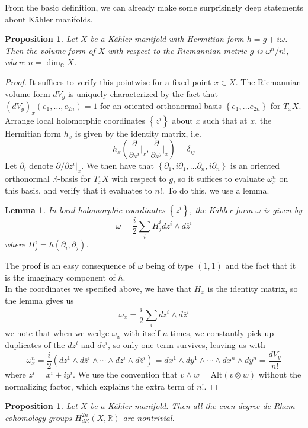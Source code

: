 \documentclass[psamsfonts, 12pt]{amsart}
\newtheorem{prop}[thm]{Proposition}
\newtheorem{lem}[thm]{Lemma}
\theoremstyle{definition}
\theoremstyle{remark}
\newcommand{\R}{\mathbb{R}}
\newcommand{\C}{\mathbb{C}}
\newcommand{\zbar}{\overline{z}}
\newcommand{\set}[1]{\left\lbrace #1 \right\rbrace}
\begin{document}
From the basic definition, we can already make some surprisingly deep statements about
K\"ahler manifolds.
%
\begin{prop}
Let $X$ be a K\"ahler manifold with Hermitian form $h = g + i\omega$. Then the volume
form of $X$ with respect to the Riemannian metric $g$ is $\omega^n/n!$, where
$n = \dim_\C X$.
\end{prop}
%
\begin{proof}
It suffices to verify this pointwise for a fixed point $x \in X$.
The Riemannian volume form $dV_g$ is uniquely characterized by the fact that
$(dV_g)_x(e_1, \ldots, e_{2n}) = 1$ for an oriented orthonormal basis
$\set{e_1, \ldots e_{2n}}$ for $T_xX$. Arrange local holomorphic coordinates
$\set{z^i}$ about $x$ such that at $x$, the Hermitian form $h_x$ is given by the
identity matrix, i.e.
\[
h_x\left(\frac{\partial}{\partial z^i}\bigg\vert_x,
\frac{\partial}{\partial z^j}\bigg\vert_x\right) = \delta_{ij}
\]
Let $\partial_i$ denote $\partial/\partial z^i\vert_x$. We then have that
$\set{\partial_1, i\partial_1, \ldots \partial_n, i\partial_n}$ is an oriented
orthonormal $\R$-basis for $T_xX$ with respect to $g$, so it suffices to evaluate
$\omega^n_x$ on this basis, and verify that it evaluates to $n!$. To do this, we
use a lemma.
%
\begin{lem}
In local holomorphic coordinates $\set{z^i}$, the K\"ahler form $\omega$ is given by
\[
\omega = \frac{i}{2}\sum_i H^i_j dz^i \wedge d\zbar^i
\]
where $H^i_j = h(\partial_i, \partial_j)$.
\end{lem}
%
The proof is an easy consequence of $\omega$ being of type $(1,1)$ and the
fact that it is the imaginary component of $h$. \\

In the coordinates we specified above, we have that $H_x$ is the identity matrix,
so the lemma gives us
\[
\omega_x = \frac{i}{2}\sum_i dz^i \wedge d\zbar^i
\]
we note that when we wedge $\omega_x$ with itself $n$ times, we constantly pick
up duplicates of the $dz^i$ and $d\zbar^i$, so only one term survives, leaving us
with
\[
\omega_x^n = \frac{i}{2}\left(dz^1 \wedge d\zbar^i \wedge \cdots \wedge
dz^i \wedge d\zbar^i\right) = dx^1 \wedge dy^1 \wedge \cdots \wedge dx^n \wedge dy^n
= \frac{dV_g}{n!}
\]
where $z^i = x^i + iy^i$. We use the convention that
$v \wedge w = \mathrm{Alt}(v\otimes w)$ without the normalizing factor, which explains
the extra term of $n!$.
%
\end{proof}
%
\begin{prop}
Let $X$ be a K\"ahler manifold. Then all the even degree de Rham cohomology groups
$H^{2n}_{dR}(X,\R)$ are nontrivial.
\end{prop}
\end{document}
